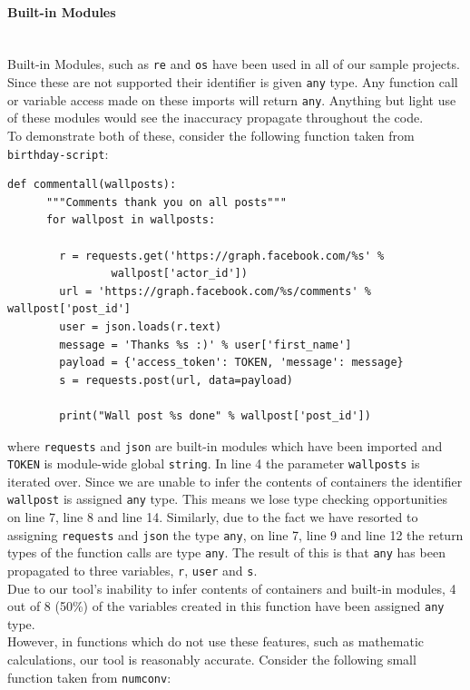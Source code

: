\documentclass[12pt, titlepage]{article}
\begin{document}
\paragraph*{Built-in Modules}\mbox{}\\
Built-in Modules, such as \texttt{re} and \texttt{os} have been used in all of our sample projects. Since these are not supported their identifier is given \texttt{any} type. Any function call or variable access made on these imports will return \texttt{any}. Anything but light use of these modules would see the inaccuracy propagate throughout the code. \\

\indent To demonstrate both of these, consider the following function taken from \texttt{birthday-script}:
\begin{lstlisting}[mathescape]
    def commentall(wallposts):
      """Comments thank you on all posts"""
      for wallpost in wallposts:

        r = requests.get('https://graph.facebook.com/%s' %
                wallpost['actor_id'])
        url = 'https://graph.facebook.com/%s/comments' % wallpost['post_id']
        user = json.loads(r.text)
        message = 'Thanks %s :)' % user['first_name']
        payload = {'access_token': TOKEN, 'message': message}
        s = requests.post(url, data=payload)

        print("Wall post %s done" % wallpost['post_id'])
\end{lstlisting}
where \texttt{requests} and \texttt{json} are built-in modules which have been imported and \texttt{TOKEN} is module-wide global \texttt{string}. In line 4 the parameter \texttt{wallposts} is iterated over. Since we are unable to infer the contents of containers the identifier \texttt{wallpost} is assigned \texttt{any} type. This means we lose type checking opportunities on line 7, line 8 and line 14. Similarly, due to the fact we have resorted to assigning \texttt{requests} and \texttt{json} the type \texttt{any}, on line 7, line 9 and line 12 the return types of the function calls are type \texttt{any}. The result of this is that \texttt{any} has been propagated to three variables, \texttt{r}, \texttt{user} and \texttt{s}. \\
\indent Due to our tool's inability to infer contents of containers and built-in modules, 4 out of 8 (50\%) of the variables created in this function have been assigned \texttt{any} type. \\
\indent However, in functions which do not use these features, such as mathematic calculations, our tool is reasonably accurate. Consider the following small function taken from \texttt{numconv}:
\end{document}
